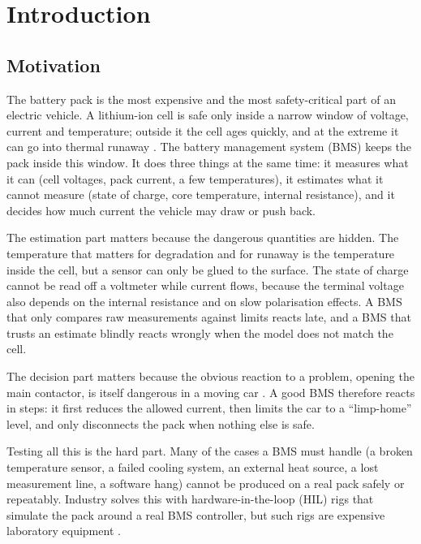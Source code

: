 \chapter{Introduction}\label{ch:intro}

\section{Motivation}
The battery pack is the most expensive and the most safety-critical part of an electric vehicle. A lithium-ion cell is safe only inside a narrow window of voltage, current and temperature; outside it the cell ages quickly, and at the extreme it can go into thermal runaway \citep{feng2018}. The battery management system (BMS) keeps the pack inside this window. It does three things at the same time: it measures what it can (cell voltages, pack current, a few temperatures), it estimates what it cannot measure (state of charge, core temperature, internal resistance), and it decides how much current the vehicle may draw or push back.

The estimation part matters because the dangerous quantities are hidden. The temperature that matters for degradation and for runaway is the temperature inside the cell, but a sensor can only be glued to the surface. The state of charge cannot be read off a voltmeter while current flows, because the terminal voltage also depends on the internal resistance and on slow polarisation effects. A BMS that only compares raw measurements against limits reacts late, and a BMS that trusts an estimate blindly reacts wrongly when the model does not match the cell.

The decision part matters because the obvious reaction to a problem, opening the main contactor, is itself dangerous in a moving car \citep{lelie2018}. A good BMS therefore reacts in steps: it first reduces the allowed current, then limits the car to a ``limp-home'' level, and only disconnects the pack when nothing else is safe.

Testing all this is the hard part. Many of the cases a BMS must handle (a broken temperature sensor, a failed cooling system, an external heat source, a lost measurement line, a software hang) cannot be produced on a real pack safely or repeatably. Industry solves this with hardware-in-the-loop (HIL) rigs that simulate the pack around a real BMS controller, but such rigs are expensive laboratory equipment \citep{barreras2016,haupt2013}.

